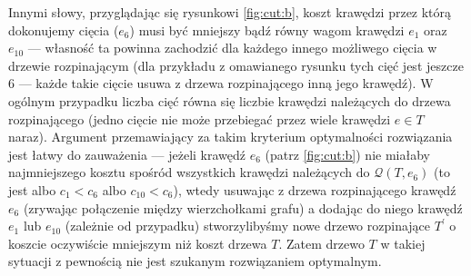 Innymi słowy, przyglądając się rysunkowi \ref{fig:cut:b}, koszt krawędzi przez którą dokonujemy cięcia ($e_{6}$) musi być mniejszy bądź równy wagom krawędzi $e_{1}$ oraz $e_{10}$ --- własność ta powinna zachodzić dla każdego innego możliwego cięcia w drzewie rozpinającym (dla przykładu z omawianego rysunku tych cięć jest jeszcze $6$ --- każde takie cięcie usuwa z drzewa rozpinającego inną jego krawędź). W ogólnym przypadku liczba cięć równa się liczbie krawędzi należących do drzewa rozpinającego (jedno cięcie nie może przebiegać przez wiele krawędzi $e \in T$ naraz). Argument przemawiający za takim kryterium optymalności rozwiązania jest łatwy do zauważenia --- jeżeli krawędź $e_{6}$ (patrz \ref{fig:cut:b}) nie miałaby najmniejszego kosztu spośród wszystkich krawędzi należących do $\mathcal{Q} \left( T, e_{6} \right)$ (to jest albo $c_{1} < c_{6}$ albo $c_{10} < c_{6}$), wtedy usuwając z drzewa rozpinającego krawędź $e_{6}$ (zrywając połączenie między wierzchołkami grafu) a dodając do niego krawędź $e_{1}$ lub $e_{10}$ (zależnie od przypadku) stworzylibyśmy nowe drzewo rozpinające $T^{\prime}$ o koszcie oczywiście mniejszym niż koszt drzewa $T$. Zatem drzewo $T$ w takiej sytuacji z pewnością nie jest szukanym rozwiązaniem optymalnym.

